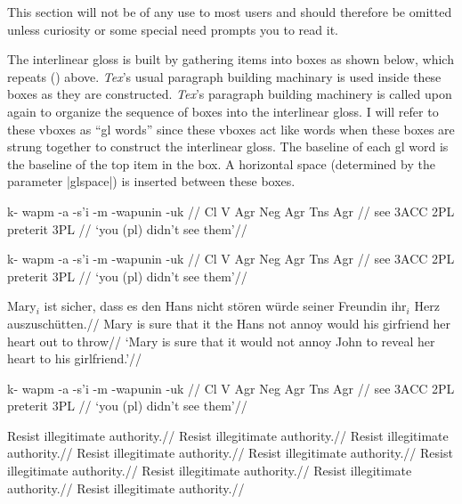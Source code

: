 \medskip

\noindent This section will not be of any use to most \expex\/
users and should therefore be omitted unless curiosity or some special
need prompts you to read it.

The interlinear gloss is built by gathering items into boxes as shown
below, which repeats () above.  {\sl Tex}'s usual
paragraph building machinary is used inside these boxes as they are
constructed.  {\sl Tex\/}'s paragraph building machinery is called
upon again to organize the sequence of boxes into the interlinear
gloss.  I will refer to these vboxes as ``gl words'' since these
vboxes act like words when these boxes are strung together to
construct the interlinear gloss.  The baseline of each gl word is the
baseline of the top item in the box. A horizontal space (determined by
the parameter |glspace|) is inserted between these boxes.

\ex
\framewords
\begingl
\gla k- wapm -a -s'i -m -wapunin -uk //
\glb Cl V Agr Neg Agr Tns Agr //
 see {3\sc ACC} {} 2{\sc PL} preterit 3{\sc PL} //
\glft `you (pl) didn't see them'//
\endgl
\xe

\ex
\begingl[everyglword=\offinterlineskip]
\gla k- wapm -a -s'i -m -wapunin -uk //
\glb Cl V Agr Neg Agr Tns Agr //
 see {3\sc ACC} {} 2{\sc PL} preterit 3{\sc PL} //
\glft `you (pl) didn't see them'//
\endgl
\xe

\ex[abovemoreglskip=0pt]
\begingl
\gla Mary$_i$ ist sicher, dass es den Hans nicht st\"oren w\"urde
seiner Freundin ihr$_i$ Herz auszusch\"utten.//
\glb Mary is sure that it the Hans not annoy would
his girfriend her heart {out to
throw}//
\glft  `Mary is sure that it would not annoy John to reveal her
heart to his girlfriend.'//
\endgl
\xe


\ex
\begingl
\gla k- wapm -a -s'i -m -wapunin -uk //
\glb[everyglb=\ninerm] Cl V Agr Neg Agr Tns Agr //
 see {3\sc ACC} {} 2{\sc PL} preterit 3{\sc PL} //
\glft `you (pl) didn't see them'//
\endgl
\xe





\ex
\begingl[everygla=\ninerm,everyglb=\tenrm,
   everyglc=\elevenrm,everygld=\twelverm,everygle=\twelvebf,everyglf=\ninerm]
\gla Resist illegitimate authority.//
\glb Resist illegitimate authority.//
\glc Resist illegitimate authority.//
\gld Resist illegitimate authority.//
\gle Resist illegitimate authority.//
\gld Resist illegitimate authority.//
\glc Resist illegitimate authority.//
\glb Resist illegitimate authority.//
\glf Resist illegitimate authority.//
\endgl
\xe


